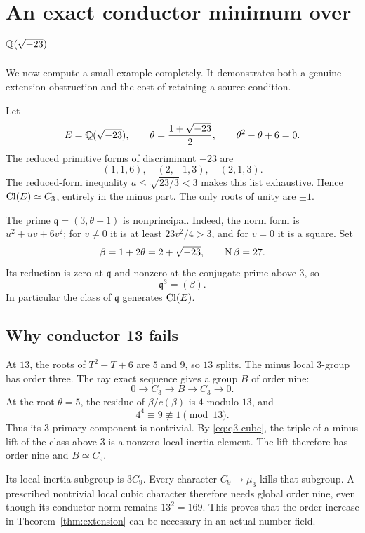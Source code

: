 \section{An exact conductor minimum over \texorpdfstring{$\mathbb Q(\sqrt{-23})$}{Q(sqrt(-23))}}\label{sec:example}

We now compute a small example completely. It demonstrates both a genuine extension obstruction and the cost of retaining a source condition.

Let
\[
 E=\mathbb Q(\sqrt{-23}),\qquad
 \theta=\frac{1+\sqrt{-23}}2,\qquad
 \theta^2-\theta+6=0.
\]
The reduced primitive forms of discriminant $-23$ are
\[
 (1,1,6),\quad(2,-1,3),\quad(2,1,3).
\]
The reduced-form inequality $a\le\sqrt{23/3}<3$ makes this list exhaustive. Hence $\operatorname{Cl}(E)\simeq C_3$, entirely in the minus part. The only roots of unity are $\pm1$.

The prime $\mathfrak q=(3,\theta-1)$ is nonprincipal. Indeed, the norm form is $u^2+uv+6v^2$; for $v\ne0$ it is at least $23v^2/4>3$, and for $v=0$ it is a square. Set
\[
 \beta=1+2\theta=2+\sqrt{-23},\qquad \operatorname{N}\beta=27.
\]
Its reduction is zero at $\mathfrak q$ and nonzero at the conjugate prime above $3$, so
\begin{equation}\label{eq:q3-cube}
                       \mathfrak q^3=(\beta).
\end{equation}
In particular the class of $\mathfrak q$ generates $\operatorname{Cl}(E)$.

\subsection{Why conductor 13 fails}

At $13$, the roots of $T^2-T+6$ are $5$ and $9$, so $13$ splits. The minus local $3$-group has order three. The ray exact sequence gives a group $B$ of order nine:
\[
 0\longrightarrow C_3\longrightarrow B\longrightarrow C_3\longrightarrow0.
\]
At the root $\theta=5$, the residue of $\beta/c(\beta)$ is $4$ modulo $13$, and
\[
                           4^4\equiv9\not\equiv1\pmod {13}.
\]
Thus its $3$-primary component is nontrivial. By \eqref{eq:q3-cube}, the triple of a minus lift of the class above $3$ is a nonzero local inertia element. The lift therefore has order nine and $B\simeq C_9$.

Its local inertia subgroup is $3C_9$. Every character $C_9\to\mu_3$ kills that subgroup. A prescribed nontrivial local cubic character therefore needs global order nine, even though its conductor norm remains $13^2=169$. This proves that the order increase in Theorem~\ref{thm:extension} can be necessary in an actual number field.

